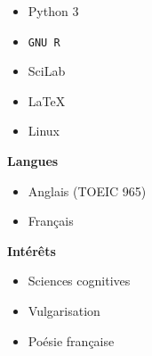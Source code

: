 \documentclass[12pt]{article}
\newlength\cvRightWidth
\begin{document}
\begin{minipage}[t]{\textwidth}
\begin{minipage}[t]{\cvRightWidth}
\begin{multicols}{2}
\begin{itemize}
                    \item Python 3
                    \item\texttt{GNU R}
                    \item SciLab
                    \item\LaTeX
                    \item Linux
                \end{itemize}
            \end{multicols}
            \textbf{Langues}
            \begin{multicols}{2}
                \begin{itemize}
                    \item Anglais {\footnotesize(TOEIC 965)}
                    \item Français
                \end{itemize}
            \end{multicols}
            \textbf{Intérêts}
            \begin{multicols}{2}
                \begin{itemize}
                    \item Sciences cognitives
                    \item Vulgarisation
                    \item Poésie française
                \end{itemize}
            \end{multicols}
        \end{minipage}
    \end{minipage}
\end{document}
